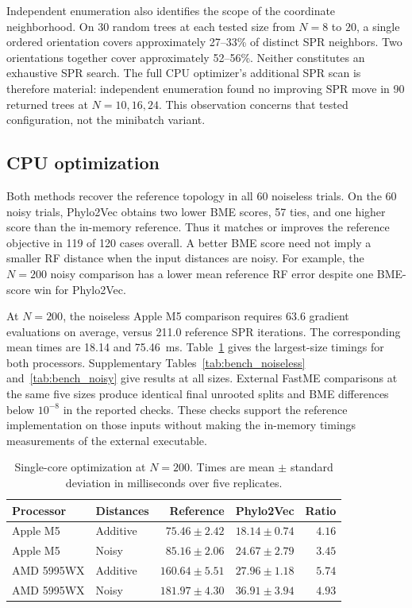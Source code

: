 \documentclass[11pt,a4paper]{article}
\makeatletter
\DeclareRobustCommand{\_}{\ifmmode\nfss@text{\textunderscore}\else\textunderscore\allowbreak\fi}
\theoremstyle{definition}
\makeatother
\begin{document}
Independent enumeration also identifies the scope of the coordinate neighborhood.
On 30 random trees at each tested size from $N=8$ to $20$, a single ordered orientation covers approximately 27--33\% of distinct SPR neighbors.
Two orientations together cover approximately 52--56\%.
Neither constitutes an exhaustive SPR search.
The full CPU optimizer's additional SPR scan is therefore material: independent enumeration found no improving SPR move in 90 returned trees at $N=10,16,24$.
This observation concerns that tested configuration, not the minibatch variant.

\subsection{CPU optimization}

Both methods recover the reference topology in all 60 noiseless trials.
On the 60 noisy trials, Phylo2Vec obtains two lower BME scores, 57 ties, and one higher score than the in-memory reference.
Thus it matches or improves the reference objective in 119 of 120 cases overall.
A better BME score need not imply a smaller RF distance when the input distances are noisy.
For example, the $N=200$ noisy comparison has a lower mean reference RF error despite one BME-score win for Phylo2Vec.

At $N=200$, the noiseless Apple M5 comparison requires 63.6 gradient evaluations on average, versus 211.0 reference SPR iterations.
The corresponding mean times are 18.14 and 75.46~ms.
Table~\ref{tab:cpu_summary} gives the largest-size timings for both processors.
Supplementary Tables~\ref{tab:bench_noiseless} and~\ref{tab:bench_noisy} give results at all sizes.
External FastME comparisons at the same five sizes produce identical final unrooted splits and BME differences below $10^{-8}$ in the reported checks.
These checks support the reference implementation on those inputs without making the in-memory timings measurements of the external executable.

\begin{table}[tb]
\centering
\caption{Single-core optimization at $N=200$. Times are mean $\pm$ standard deviation in milliseconds over five replicates.}
\label{tab:cpu_summary}
\small
\begin{tabular}{@{}llrrr@{}}
\toprule
Processor & Distances & Reference & Phylo2Vec & Ratio\\
\midrule
Apple M5 & Additive & $75.46\pm2.42$ & $18.14\pm0.74$ & $4.16$\\
Apple M5 & Noisy & $85.16\pm2.06$ & $24.67\pm2.79$ & $3.45$\\
AMD 5995WX & Additive & $160.64\pm5.51$ & $27.96\pm1.18$ & $5.74$\\
AMD 5995WX & Noisy & $181.97\pm4.30$ & $36.91\pm3.94$ & $4.93$\\
\bottomrule
\end{tabular}
\end{table}
\end{document}
